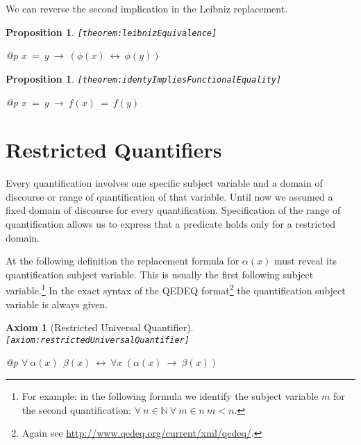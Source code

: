 \documentclass[a4paper,german,10pt,twoside]{book}
\newtheorem{prop}[thm]{Proposition}
\newtheorem{ax}{Axiom}
\theoremstyle{definition}
\theoremstyle{remark}
\begin{document}
\par
We can reverse the second implication in the Leibniz replacement.

\begin{prop}
\label{theorem:leibnizEquivalence} \hypertarget{theorem:leibnizEquivalence}{}
{\tt \tiny [\verb]theorem:leibnizEquivalence]]}
\mbox{}
\begin{longtable}{{@{\extracolsep{\fill}}p{\linewidth}}}
\centering $x \ = \ y\ \rightarrow\ (\phi(x)\ \leftrightarrow\ \phi(y))$
\end{longtable}

\end{prop}


\begin{prop}
\label{theorem:identyImpliesFunctionalEquality} \hypertarget{theorem:identyImpliesFunctionalEquality}{}
{\tt \tiny [\verb]theorem:identyImpliesFunctionalEquality]]}
\mbox{}
\begin{longtable}{{@{\extracolsep{\fill}}p{\linewidth}}}
\centering $x \ = \ y\ \rightarrow\ f(x) \ = \ f(y)$
\end{longtable}

\end{prop}


\section{Restricted Quantifiers} \label{chapter7_section2} \hypertarget{chapter7_section2}{}
Every quantification involves one specific subject variable and a domain of discourse or range of quantification of that variable. Until now we assumed a fixed domain of discourse for every quantification. Specification of the range of quantification allows us to express that a predicate holds only for a restricted domain.

\par
At the following definition the replacement formula for $\alpha(x)$ must {\glqq reveal\grqq} its quantification subject variable. This is usually the first following subject variable.\footnote{For example: in the following formula we identify the subject variable $m$ for the second quantification: $\forall \ n \in \mathbb{N} \ \forall \ m \in n \ m < n $.} In the exact syntax of the QEDEQ format\footnote{Again see \url{http://www.qedeq.org/current/xml/qedeq/}.} the quantification subject variable is always given.

\begin{ax}[Restricted Universal Quantifier]
\label{axiom:restrictedUniversalQuantifier} \hypertarget{axiom:restrictedUniversalQuantifier}{}
{\tt \tiny [\verb]axiom:restrictedUniversalQuantifier]]}
\mbox{}
\begin{longtable}{{@{\extracolsep{\fill}}p{\linewidth}}}
\centering $\forall \ \alpha(x)\ \ \beta(x)\ \leftrightarrow\ \forall x\ (\alpha(x)\ \rightarrow\ \beta(x))$
\end{longtable}

\end{ax}
\end{document}
